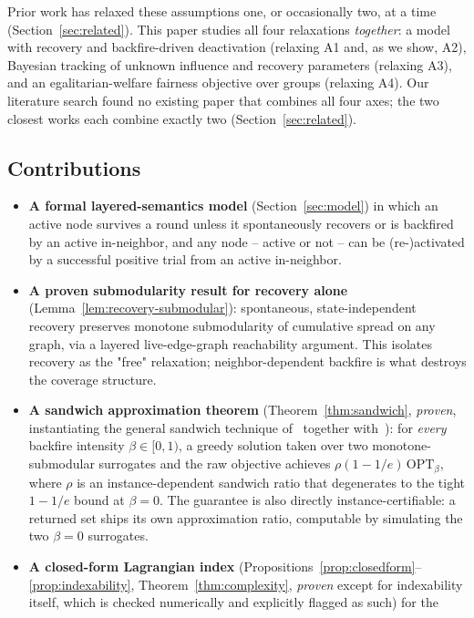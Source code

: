 \documentclass[journal]{IEEEtran}
\begin{document}
Prior work has relaxed these assumptions one, or occasionally two, at a
time (Section~\ref{sec:related}). This paper studies all four relaxations
\emph{together}: a model with recovery and backfire-driven deactivation
(relaxing A1 and, as we show, A2), Bayesian tracking of unknown influence
and recovery parameters (relaxing A3), and an egalitarian-welfare
fairness objective over groups (relaxing A4). Our literature search found no
existing paper that combines all four axes; the two closest works each
combine exactly two (Section~\ref{sec:related}).

\subsection*{Contributions}
\begin{itemize}
\item \textbf{A formal layered-semantics model} (Section~\ref{sec:model})
  in which an active node survives a round unless it spontaneously recovers
  or is backfired by an active in-neighbor, and any node -- active or not --
  can be (re-)activated by a successful positive trial from an active
  in-neighbor.
\item \textbf{A proven submodularity result for recovery alone}
  (Lemma~\ref{lem:recovery-submodular}): spontaneous, state-independent
  recovery preserves monotone submodularity of cumulative spread on any
  graph, via a layered live-edge-graph reachability argument. This isolates
  recovery as the "free" relaxation; neighbor-dependent backfire is what
  destroys the coverage structure.
\item \textbf{A sandwich approximation theorem} (Theorem~\ref{thm:sandwich},
  \emph{proven}, instantiating the general sandwich technique
  of~\cite{lu2015competition} together with~\cite{nemhauser1978analysis}):
  for \emph{every} backfire intensity $\beta \in [0,1)$, a greedy solution
  taken over two monotone-submodular surrogates and the raw objective
  achieves $\rho(1-1/e)\,\mathrm{OPT}_\beta$, where $\rho$ is an
  instance-dependent sandwich ratio that degenerates to the tight $1-1/e$
  bound at $\beta=0$. The guarantee is also directly instance-certifiable:
  a returned set ships its own approximation ratio, computable by simulating
  the two $\beta=0$ surrogates.
\item \textbf{A closed-form Lagrangian index} (Propositions~\ref{prop:closedform}--\ref{prop:indexability},
  Theorem~\ref{thm:complexity}, \emph{proven} except for indexability itself,
  which is checked numerically and explicitly flagged as such) for the

\end{itemize}
\end{document}

